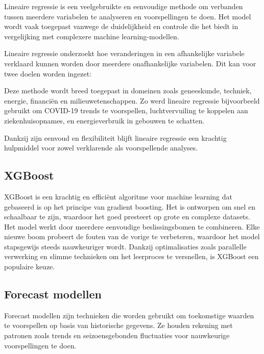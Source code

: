Lineaire regressie is een veelgebruikte en eenvoudige methode om verbanden tussen meerdere variabelen te analyseren en voorspellingen te doen. Het model wordt vaak toegepast vanwege de duidelijkheid en controle die het biedt in vergelijking met complexere machine learning-modellen.\autocite{Etemadi2021}

\vspace{1em}

Lineaire regressie onderzoekt hoe veranderingen in een afhankelijke variabele verklaard kunnen worden door meerdere onafhankelijke variabelen. Dit kan voor twee doelen worden ingezet:

\vspace{1em}

Deze methode wordt breed toegepast in domeinen zoals geneeskunde, techniek, energie, financiën en milieuwetenschappen. Zo werd lineaire regressie bijvoorbeeld gebruikt om COVID-19 trends te voorspellen, luchtvervuiling te koppelen aan ziekenhuisopnames, en energieverbruik in gebouwen te schatten.

\vspace{1em}

Dankzij zijn eenvoud en flexibiliteit blijft lineaire regressie een krachtig hulpmiddel voor zowel verklarende als voorspellende analyses.

\newpage

\subsection*{XGBoost}

XGBoost is een krachtig en efficiënt algoritme voor machine learning dat gebaseerd is op het principe van gradient boosting. Het is ontworpen om snel en schaalbaar te zijn, waardoor het goed presteert op grote en complexe datasets. Het model werkt door meerdere eenvoudige beslissingsbomen te combineren. Elke nieuwe boom probeert de fouten van de vorige te verbeteren, waardoor het model stapsgewijs steeds nauwkeuriger wordt. Dankzij optimalisaties zoals parallelle verwerking en slimme technieken om het leerproces te versnellen, is XGBoost een populaire keuze.\autocite{Hakkal2024}

\subsection{Forecast modellen}

Forecast modellen zijn technieken die worden gebruikt om toekomstige waarden te voorspellen op basis van historische gegevens. Ze houden rekening met patronen zoals trends en seizoensgebonden fluctuaties voor nauwkeurige voorspellingen te doen.

